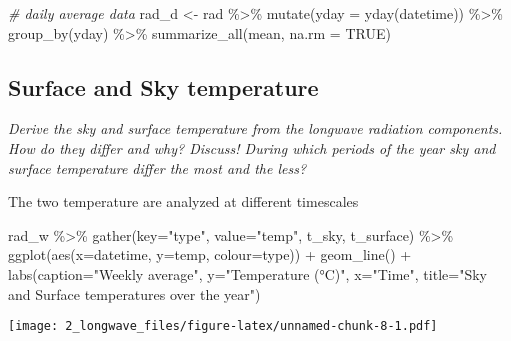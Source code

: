 \documentclass[
]{article}
\newenvironment{Shaded}{\begin{snugshade}}{\end{snugshade}}
\newcommand{\AttributeTok}[1]{\textcolor[rgb]{0.77,0.63,0.00}{#1}}
\newcommand{\CommentTok}[1]{\textcolor[rgb]{0.56,0.35,0.01}{\textit{#1}}}
\newcommand{\ConstantTok}[1]{\textcolor[rgb]{0.00,0.00,0.00}{#1}}
\newcommand{\FunctionTok}[1]{\textcolor[rgb]{0.00,0.00,0.00}{#1}}
\newcommand{\NormalTok}[1]{#1}
\newcommand{\OtherTok}[1]{\textcolor[rgb]{0.56,0.35,0.01}{#1}}
\newcommand{\SpecialCharTok}[1]{\textcolor[rgb]{0.00,0.00,0.00}{#1}}
\newcommand{\StringTok}[1]{\textcolor[rgb]{0.31,0.60,0.02}{#1}}
\begin{document}
\begin{Shaded}
\begin{Highlighting}[]
\CommentTok{\# daily average data}
\NormalTok{rad\_d }\OtherTok{\textless{}{-}}\NormalTok{ rad }\SpecialCharTok{\%\textgreater{}\%}
  \FunctionTok{mutate}\NormalTok{(}\AttributeTok{yday =} \FunctionTok{yday}\NormalTok{(datetime)) }\SpecialCharTok{\%\textgreater{}\%}
  \FunctionTok{group\_by}\NormalTok{(yday) }\SpecialCharTok{\%\textgreater{}\%}
  \FunctionTok{summarize\_all}\NormalTok{(mean, }\AttributeTok{na.rm =} \ConstantTok{TRUE}\NormalTok{)}
\end{Highlighting}
\end{Shaded}

\newpage

\hypertarget{surface-and-sky-temperature}{%
\subsection{Surface and Sky
temperature}\label{surface-and-sky-temperature}}

\emph{Derive the sky and surface temperature from the longwave radiation
components. How do they differ and why? Discuss! During which periods of
the year sky and surface temperature differ the most and the less?}

The two temperature are analyzed at different timescales

\begin{Shaded}
\begin{Highlighting}[]
\NormalTok{rad\_w }\SpecialCharTok{\%\textgreater{}\%}
  \FunctionTok{gather}\NormalTok{(}\AttributeTok{key=}\StringTok{"type"}\NormalTok{, }\AttributeTok{value=}\StringTok{"temp"}\NormalTok{, t\_sky, t\_surface) }\SpecialCharTok{\%\textgreater{}\%}
\FunctionTok{ggplot}\NormalTok{(}\FunctionTok{aes}\NormalTok{(}\AttributeTok{x=}\NormalTok{datetime, }\AttributeTok{y=}\NormalTok{temp, }\AttributeTok{colour=}\NormalTok{type)) }\SpecialCharTok{+}
  \FunctionTok{geom\_line}\NormalTok{() }\SpecialCharTok{+}
  \FunctionTok{labs}\NormalTok{(}\AttributeTok{caption=}\StringTok{"Weekly average"}\NormalTok{, }\AttributeTok{y=}\StringTok{"Temperature (°C)"}\NormalTok{, }\AttributeTok{x=}\StringTok{"Time"}\NormalTok{,}
       \AttributeTok{title=}\StringTok{"Sky and Surface temperatures over the year"}\NormalTok{)}
\end{Highlighting}
\end{Shaded}

\texttt{[image: 2\_longwave\_files/figure-latex/unnamed-chunk-8-1.pdf]}
\newpage
\end{document}
